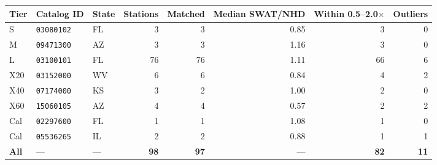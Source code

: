 \begin{tabular}{@{}lllrrrrr@{}}
\toprule
Tier & Catalog ID & State & Stations & Matched & Median SWAT/NHD & Within 0.5--2.0$\times$ & Outliers \\
\midrule
S & \texttt{03080102} & FL & 3 & 3 & 0.85 & 3 & 0 \\
M & \texttt{09471300} & AZ & 3 & 3 & 1.16 & 3 & 0 \\
L & \texttt{03100101} & FL & 76 & 76 & 1.11 & 66 & 6 \\
X20 & \texttt{03152000} & WV & 6 & 6 & 0.84 & 4 & 2 \\
X40 & \texttt{07174000} & KS & 3 & 2 & 1.00 & 2 & 0 \\
X60 & \texttt{15060105} & AZ & 4 & 4 & 0.57 & 2 & 2 \\
Cal & \texttt{02297600} & FL & 1 & 1 & 1.08 & 1 & 0 \\
Cal & \texttt{05536265} & IL & 2 & 2 & 0.88 & 1 & 1 \\
\midrule
\textbf{All} & --- & --- & \textbf{98} & \textbf{97} & --- & \textbf{82} & \textbf{11} \\
\bottomrule
\end{tabular}
